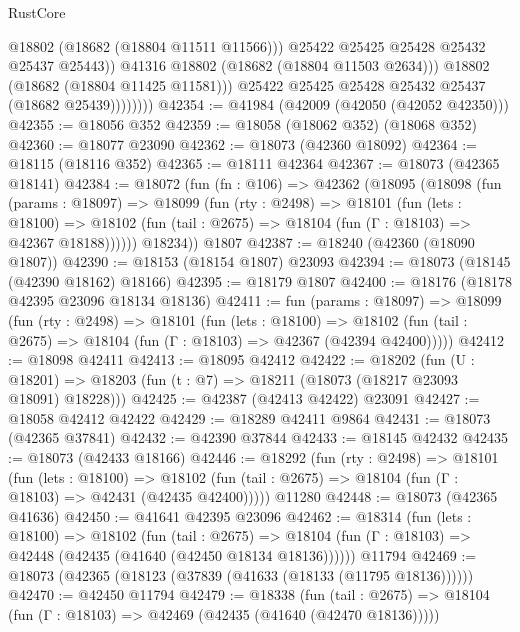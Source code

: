 \begin{lexlean}{RustCore}
\begin{coremodule}
                            @18802
                            (@18682 (@18804 @11511 @11566)))
                          @25422
                          @25425
                          @25428
                          @25432
                          @25437
                          @25443))
                      @41316
                      @18802
                      (@18682 (@18804 @11503 @2634)))
                    @18802
                    (@18682 (@18804 @11425 @11581)))
                  @25422
                  @25425
                  @25428
                  @25432
                  @25437
                  (@18682 @25439))))))))
@42354 := @41984 (@42009 (@42050 (@42052 @42350)))
@42355 := @18056 @352
@42359 := @18058 (@18062 @352) (@18068 @352)
@42360 := @18077 @23090
@42362 := @18073 (@42360 @18092)
@42364 := @18115 (@18116 @352)
@42365 := @18111 @42364
@42367 := @18073 (@42365 @18141)
@42384 := @18072
    (fun (fn : @106) =>
    @42362
      (@18095
        (@18098
          (fun (params : @18097) =>
          @18099
            (fun (rty : @2498) =>
            @18101
              (fun (lets : @18100) =>
              @18102 (fun (tail : @2675) => @18104 (fun (Γ : @18103) => @42367 @18188))))))
        @18234))
    @1807
@42387 := @18240 (@42360 (@18090 @1807))
@42390 := @18153 (@18154 @1807) @23093
@42394 := @18073 (@18145 (@42390 @18162) @18166)
@42395 := @18179 @1807
@42400 := @18176 (@18178 @42395 @23096 @18134 @18136)
@42411 := fun (params : @18097) =>
  @18099
    (fun (rty : @2498) =>
    @18101
      (fun (lets : @18100) =>
      @18102 (fun (tail : @2675) => @18104 (fun (Γ : @18103) => @42367 (@42394 @42400)))))
@42412 := @18098 @42411
@42413 := @18095 @42412
@42422 := @18202
    (fun (U : @18201) => @18203 (fun (t : @7) => @18211 (@18073 (@18217 @23093 @18091) @18228)))
@42425 := @42387 (@42413 @42422) @23091
@42427 := @18058 @42412 @42422
@42429 := @18289 @42411 @9864
@42431 := @18073 (@42365 @37841)
@42432 := @42390 @37844
@42433 := @18145 @42432
@42435 := @18073 (@42433 @18166)
@42446 := @18292
    (fun (rty : @2498) =>
    @18101
      (fun (lets : @18100) =>
      @18102 (fun (tail : @2675) => @18104 (fun (Γ : @18103) => @42431 (@42435 @42400)))))
    @11280
@42448 := @18073 (@42365 @41636)
@42450 := @41641 @42395 @23096
@42462 := @18314
    (fun (lets : @18100) =>
    @18102
      (fun (tail : @2675) =>
      @18104 (fun (Γ : @18103) => @42448 (@42435 (@41640 (@42450 @18134 @18136))))))
    @11794
@42469 := @18073 (@42365 (@18123 (@37839 (@41633 (@18133 (@11795 @18136))))))
@42470 := @42450 @11794
@42479 := @18338
    (fun (tail : @2675) => @18104 (fun (Γ : @18103) => @42469 (@42435 (@41640 (@42470 @18136)))))

\end{coremodule}
\end{lexlean}
